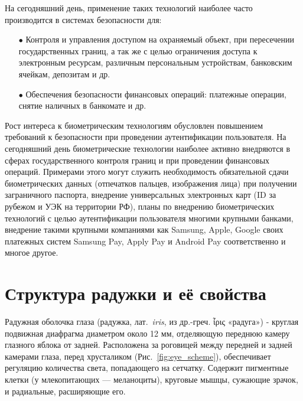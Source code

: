 На сегодняшний день, применение таких технологий наиболее часто производится в системах безопасности для:
\begin{enumerate}
	\setlength\itemsep{0.01em}
	\item[$\bullet$] Контроля и управления доступом на охраняемый объект, при пересечении государственных границ, а так же с целью ограничения доступа к электронным ресурсам, различным персональным устройствам, банковским ячейкам, депозитам и др.
	\item[$\bullet$] Обеспечения безопасности финансовых операций: платежные операции, снятие наличных в банкомате и др.
\end{enumerate}
	

Рост интереса к биометрическим технологиям обусловлен повышением требований к безопасности при проведении аутентификации пользователя. На сегодняшний день биометрические технологии наиболее активно внедряются в сферах государственного контроля границ и при проведении финансовых операций. Примерами этого могут служить необходимость обязательной сдачи биометрических данных (отпечатков пальцев, изображения лица) при получении заграничного паспорта, внедрение универсальных электронных карт (ID за рубежом и УЭК на территории РФ), планы по внедрению биометрических технологий с целью аутентификации пользователя многими крупными банками, внедрение такими крупными компаниями как Samsung, Apple, Google своих платежных систем Samsung Pay, Apply Pay и Android Pay соответственно и многое другое.


\section{Структура радужки и её свойства}
\label{sec:iris-structure-and-properties}

Радужная оболочка глаза (радужка, лат.~\textit{iris}, из др.-греч. \textgreek{ἶρις} «радуга») - круглая подвижная диафрагма диаметром около 12 мм, отделяющую переднюю камеру глазного яблока от задней. Расположена за роговицей между передней и задней камерами глаза, перед хрусталиком (Рис.~\ref{fig:eye_scheme}), обеспечивает регуляцию количества света, попадающего на сетчатку. Содержит пигментные клетки (у млекопитающих — меланоциты), круговые мышцы, сужающие зрачок, и радиальные, расширяющие его.

